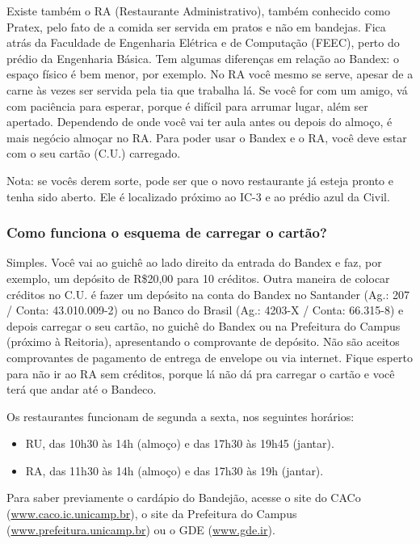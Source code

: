 Existe também o RA (Restaurante Administrativo), também conhecido como Pratex,
pelo fato de a comida ser servida em pratos e não em bandejas. Fica atrás da
Faculdade de Engenharia Elétrica e de Computação (FEEC), perto do prédio da Engenharia Básica. Tem algumas diferenças em
relação ao Bandex: o espaço físico é bem menor, por exemplo. No RA você mesmo se
serve, apesar de a carne às vezes ser servida pela tia que trabalha lá. Se você
for com um amigo, vá com paciência para esperar, porque é difícil para arrumar
lugar, além ser apertado. Dependendo de onde você vai ter aula antes ou
depois do almoço, é mais negócio almoçar no RA. Para poder usar o Bandex
e o RA, você deve estar com o seu cartão (C.U.) carregado.

Nota: se vocês derem sorte, pode ser que o novo restaurante já esteja pronto e tenha
sido aberto. Ele é localizado próximo ao IC-3 e ao prédio azul da Civil.

\subsubsection{Como funciona o esquema de carregar o cartão?}

Simples. Você vai ao guichê ao lado direito da entrada do Bandex e faz, por
exemplo, um depósito de R\$20,00 para 10 créditos. Outra maneira de colocar
créditos no C.U. é fazer um depósito na conta do Bandex no Santander (Ag.: 207
/ Conta: 43.010.009-2) ou no Banco do Brasil (Ag.: 4203-X / Conta: 66.315-8)
e depois carregar o seu cartão, no guichê do Bandex ou na Prefeitura do Campus
(próximo à Reitoria), apresentando o comprovante de depósito. Não são aceitos
comprovantes de pagamento de entrega de envelope ou via internet. Fique esperto
para não ir ao RA sem créditos, porque lá não dá pra carregar o cartão e você
terá que andar até o Bandeco.

Os restaurantes funcionam de segunda a sexta, nos seguintes horários:

\begin{itemize}
\item  RU, das 10h30 às 14h (almoço) e das 17h30 às 19h45 (jantar).
\item  RA, das 11h30 às 14h (almoço) e das 17h30 às 19h (jantar).
\end{itemize}

Para saber previamente o cardápio do Bandejão, acesse o site do CACo (\url{www.caco.ic.unicamp.br}),
o site da Prefeitura do Campus (\url{www.prefeitura.unicamp.br}) ou o
GDE (\url{www.gde.ir}).

